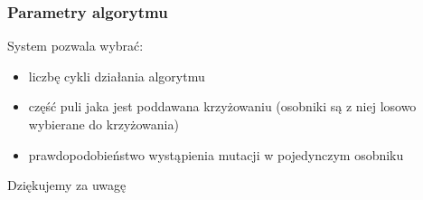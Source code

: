 \documentclass{beamer}
\begin{document}

\begin{frame}
\frametitle{Parametry algorytmu}

System pozwala wybrać:
\begin{itemize}
\item liczbę cykli działania algorytmu
\item część puli jaka jest poddawana krzyżowaniu (osobniki są z niej losowo wybierane do krzyżowania)
\item prawdopodobieństwo wystąpienia mutacji w pojedynczym osobniku
\end{itemize}
\end{frame}



\begin{frame}
\Huge{\centerline{Dziękujemy za uwagę}}
\end{frame}

\end{document}
